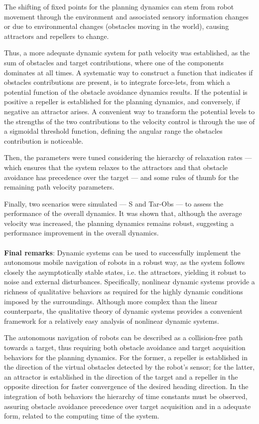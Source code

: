 The shifting of fixed points for the planning dynamics can stem from robot
movement through the environment and associated sensory information 
changes or due to environmental changes (obstacles moving in the world), causing
attractors and repellers to change. 

Thus, a more adequate dynamic system for path velocity was
established, as the sum of obstacles and target contributions, where one of the
components dominates at all times. A systematic way to construct a
function that indicates if obstacles contributions are present, is to integrate
force-lets, from which a potential function of the obstacle avoidance dynamics
results. If the potential is positive a repeller is established for the planning
dynamics, and conversely, if negative an attractor arises. A convenient way 
to transform the potential levels to the strengths of the two contributions
to the velocity control is through the use of a sigmoidal threshold function,
defining the angular range the obstacles contribution is noticeable.

Then, the parameters were tuned considering the hierarchy of relaxation rates
--- which ensures that the system relaxes to the attractors and that obstacle
avoidance has precedence over the target --- and some rules of thumb for the
remaining path velocity parameters.

Finally, two scenarios were simulated --- S and Tar-Obs --- to assess the
performance of the overall dynamics. It was shown that, although the average
velocity was increased, the planning dynamics remains robust, suggesting a performance improvement in the overall dynamics.
%
\\\\
\textbf{Final remarks}:
Dynamic systems can be used to successfully implement the autonomous mobile
navigation of robots in a robust way, as the system follows closely the
asymptotically stable states, i.e. the attractors, yielding it robust to noise
and external disturbances. Specifically, nonlinear dynamic systems provide a
richness of qualitative behaviors as required for the highly dynamic conditions
imposed by the surroundings. Although more complex than the linear counterparts,
the qualitative theory of dynamic systems provides a convenient framework for a
relatively easy analysis of nonlinear dynamic systems.

The autonomous navigation of robots can be described as a collision-free path
towards a target, thus requiring both obstacle avoidance and target acquisition
behaviors for the planning dynamics. For the former, a repeller is established in the direction of the
virtual obstacles detected by the robot's sensor; for the latter, an attractor
is established in the direction of the target and a repeller in the opposite
direction for faster convergence of the desired heading direction. In the
integration of both behaviors the hierarchy of time constants must be observed,
assuring obstacle avoidance precedence over target acquisition and in a adequate
form, related to the computing time of the system.

